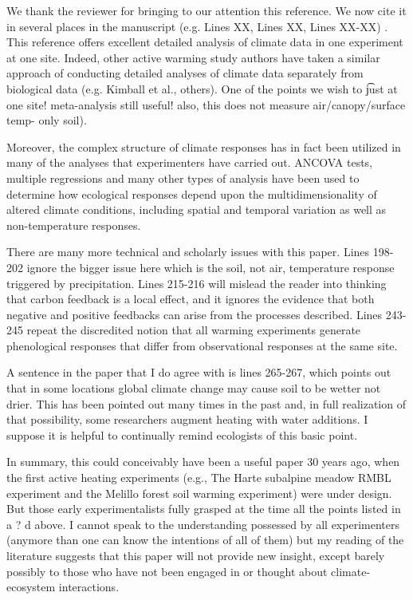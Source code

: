 \documentclass[11pt,a4paper]{letter}
\begin{document}
\begin{letter}{}
We thank the reviewer for bringing to our attention this reference. We now cite it in several places in the manuscript (e.g. Lines XX, Lines XX, Lines XX-XX) . This reference offers excellent detailed analysis of climate data in one experiment at one site. Indeed, other active warming study authors have taken a similar approach of conducting detailed analyses of climate data separately from biological data (e.g. Kimball et al., others). One of the points we wish to \t just at one site! meta-analysis still useful!
also, this does not measure air/canopy/surface temp- only soil).


Moreover, the complex structure of climate responses has in fact been utilized in many of the analyses that experimenters have carried out.  ANCOVA tests, multiple regressions and many other types of analysis have been used to determine how ecological responses depend upon the multidimensionality of altered climate conditions, including spatial and temporal variation as well as non-temperature responses.

There are many more technical and scholarly issues with this paper.  Lines 198-202 ignore the bigger issue here which is the soil, not air, temperature response triggered by precipitation.  Lines 215-216 will mislead the reader into thinking that carbon feedback is a local effect, and it ignores the evidence that both negative and positive feedbacks can arise from the processes described.  Lines 243-245 repeat the discredited notion that all warming experiments generate phenological responses that differ from observational responses at the same site.  

A sentence in the paper that I do agree with is lines 265-267, which points out that in some locations global climate change may cause soil to be wetter not drier.  This has been pointed out many times in the past and, in full realization of that possibility, some researchers augment heating with water additions.  I suppose it is helpful to continually remind ecologists of this basic point.

In summary, this could conceivably have been a useful paper 30 years ago, when the first active heating experiments (e.g., The Harte subalpine meadow RMBL experiment and the Melillo forest soil warming experiment) were under design.  But those early experimentalists fully grasped at the time all the points listed in a ? d above.  I cannot speak to the understanding possessed by all experimenters (anymore than one can know the intentions of all of them) but my reading of the literature suggests that this paper will not provide new insight, except barely possibly to those who have not been engaged in or thought about climate-ecosystem interactions. 



\end{letter}
\end{document}

